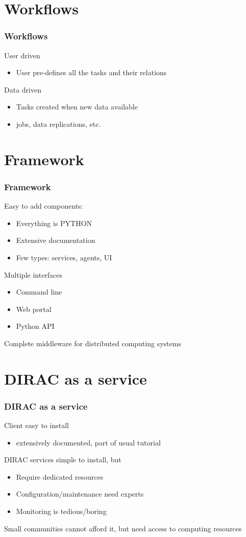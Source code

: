 \documentclass[14pt]{beamer}
\begin{document}
\section{Workflows}
\begin{frame}
\frametitle{Workflows}
\begin{block}{User driven}
\begin{itemize}
\item User pre-defines all the tasks and their relations
\end{itemize}
\end{block}
\pause
\begin{block}{Data driven}
\begin{itemize}
\item Tasks created when new data available
\item jobs, data replications, etc.
\end{itemize}
\end{block}
\end{frame}

\section{Framework}
\begin{frame}
\frametitle{Framework}
Easy to add components:
\begin{itemize}
\item Everything is PYTHON
\item Extensive documentation
\item Few types: services, agents, UI
\end{itemize}
Multiple interfaces
\begin{itemize}
\item Command line
\item Web portal
\item Python API
\end{itemize}
\alert{Complete middleware for distributed computing systems}
\end{frame}

\section{DIRAC as a service}
\begin{frame}
\frametitle{DIRAC as a service}
Client easy to install
\begin{itemize}
\item extensively documented, part of usual tutorial
\end{itemize}
DIRAC services simple to install, \alert{but}
\begin{itemize}
\item Require dedicated resources
\item Configuration/maintenance need experts
\item Monitoring is tedious/boring
\end{itemize}
\alert{Small communities cannot afford it, but need access to computing resources}
\end{frame}
\end{document}
